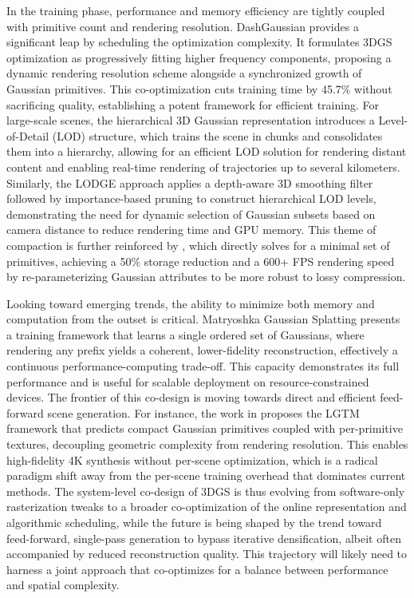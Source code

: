 \documentclass[11pt,a4paper]{article}
\begin{document}
In the training phase, performance and memory efficiency are tightly coupled with primitive count and rendering resolution. DashGaussian \cite{arxiv:2503.18402v2} provides a significant leap by scheduling the optimization complexity. It formulates 3DGS optimization as progressively fitting higher frequency components, proposing a dynamic rendering resolution scheme alongside a synchronized growth of Gaussian primitives. This co-optimization cuts training time by 45.7\% without sacrificing quality, establishing a potent framework for efficient training. For large-scale scenes, the hierarchical 3D Gaussian representation \cite{arxiv:2406.12080v1} introduces a Level-of-Detail (LOD) structure, which trains the scene in chunks and consolidates them into a hierarchy, allowing for an efficient LOD solution for rendering distant content and enabling real-time rendering of trajectories up to several kilometers. Similarly, the LODGE approach \cite{arxiv:2505.23158v2} applies a depth-aware 3D smoothing filter followed by importance-based pruning to construct hierarchical LOD levels, demonstrating the need for dynamic selection of Gaussian subsets based on camera distance to reduce rendering time and GPU memory. This theme of compaction is further reinforced by \cite{arxiv:2503.16924v2}, which directly solves for a minimal set of primitives, achieving a 50\% storage reduction and a 600+ FPS rendering speed by re-parameterizing Gaussian attributes to be more robust to lossy compression.

Looking toward emerging trends, the ability to minimize both memory and computation from the outset is critical. Matryoshka Gaussian Splatting \cite{arxiv:2603.19234v2} presents a training framework that learns a single ordered set of Gaussians, where rendering any prefix yields a coherent, lower-fidelity reconstruction, effectively a continuous performance-computing trade-off. This capacity demonstrates its full performance and is useful for scalable deployment on resource-constrained devices. The frontier of this co-design is moving towards direct and efficient feed-forward scene generation. For instance, the work in \cite{arxiv:2603.25745v1} proposes the LGTM framework that predicts compact Gaussian primitives coupled with per-primitive textures, decoupling geometric complexity from rendering resolution. This enables high-fidelity 4K synthesis without per-scene optimization, which is a radical paradigm shift away from the per-scene training overhead that dominates current methods. The system-level co-design of 3DGS is thus evolving from software-only rasterization tweaks to a broader co-optimization of the online representation and algorithmic scheduling, while the future is being shaped by the trend toward feed-forward, single-pass generation to bypass iterative densification, albeit often accompanied by reduced reconstruction quality. This trajectory will likely need to harness a joint approach that co-optimizes for a balance between performance and spatial complexity.
\end{document}
